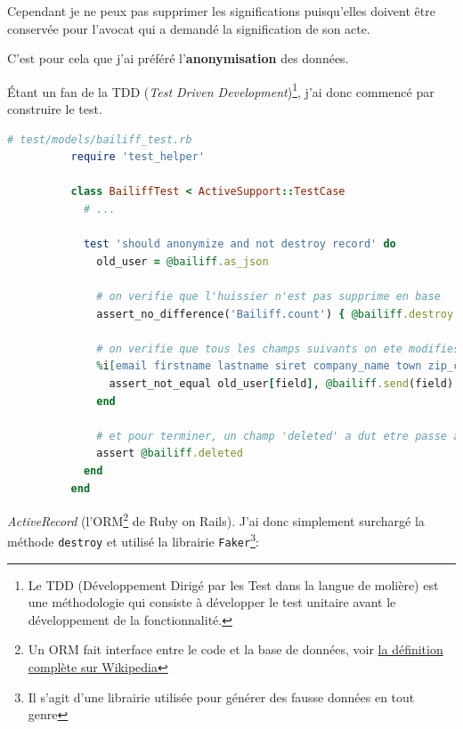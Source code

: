 \documentclass[]{report}
\begin{document}
        Cependant je ne peux pas supprimer les significations puisqu'elles doivent être conservée pour l'avocat qui a demandé la signification de son acte.

        C'est pour cela que j'ai préféré l'\textbf{anonymisation} des données.

        Étant un fan de la TDD (\textit{Test Driven Development})\footnote{Le TDD (Développement Dirigé par les Test dans la langue de molière) est une méthodologie qui consiste à développer le test unitaire avant le développement de la fonctionnalité.}, j'ai donc commencé par construire le test.

        \begin{scriptsize}
          \begin{lstlisting}[language=ruby]
          # test/models/bailiff_test.rb
          require 'test_helper'

          class BailiffTest < ActiveSupport::TestCase
            # ...

            test 'should anonymize and not destroy record' do
              old_user = @bailiff.as_json

              # on verifie que l'huissier n'est pas supprime en base
              assert_no_difference('Bailiff.count') { @bailiff.destroy }

              # on verifie que tous les champs suivants on ete modifies
              %i[email firstname lastname siret company_name town zip_code address_2 address_1].each do |field|
                assert_not_equal old_user[field], @bailiff.send(field)
              end

              # et pour terminer, un champ 'deleted' a dut etre passe a 'true'
              assert @bailiff.deleted
            end
          end
          \end{lstlisting}
        \end{scriptsize}


        \textit{ActiveRecord} (l'ORM\footnote{Un ORM fait interface entre le code et la base de données, voir \href{https://fr.wikipedia.org/wiki/Mapping_objet-relationnel}{la définition complète sur Wikipedia}} de Ruby on Rails). J'ai donc simplement surchargé la méthode \verb|destroy| et utilisé la librairie \verb|Faker|\footnote{Il s'agit d'une librairie utilisée pour générer des fausse données en tout genre}:
\end{document}
